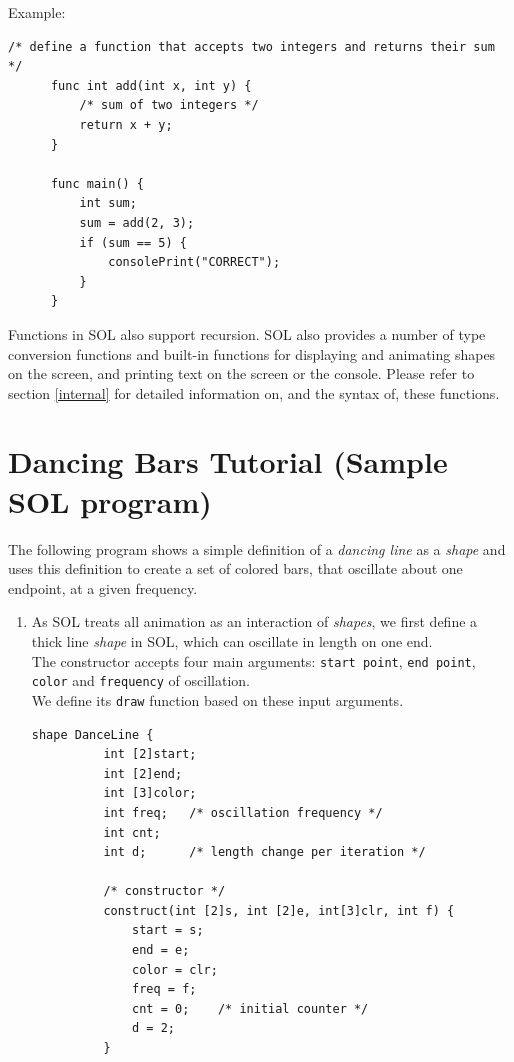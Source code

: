 \documentclass[letterpaper,12pt]{report}
\begin{document}
{    Example:\\
    \begin{lstlisting}[style=sol]
      /* define a function that accepts two integers and returns their sum */
      func int add(int x, int y) {
          /* sum of two integers */
          return x + y;
      }

      func main() {
          int sum;
          sum = add(2, 3);
          if (sum == 5) {
              consolePrint("CORRECT");
          }
      }
    \end{lstlisting}

    Functions in SOL also support recursion. SOL also provides a number of type conversion functions and built-in functions for displaying and animating shapes on the screen, and printing text on the screen or the console. Please refer to section \ref{internal} for detailed information on, and the syntax of, these functions.

  \section{Dancing Bars Tutorial (Sample SOL program)}
  The following program shows a simple definition of a \textit{dancing line} as a \textit{shape} and uses this definition to create a set of colored bars, that oscillate about one endpoint, at a given frequency.
  \begin{enumerate}
    \itemsep 0em
    \item As SOL treats all animation as an interaction of \textit{shapes}, we first define a thick line \textit{shape} in SOL, which can oscillate in length on one end.\\
    The constructor accepts four main arguments: \texttt{start point}, \texttt{end point}, \texttt{color} and \texttt{frequency} of oscillation.\\
    We define its \texttt{draw} function based on these input arguments.\\

    \begin{lstlisting}[style=sol, aboveskip=1pt]
      shape DanceLine {
          int [2]start;
          int [2]end;
          int [3]color;
          int freq;   /* oscillation frequency */
          int cnt;
          int d;      /* length change per iteration */

          /* constructor */
          construct(int [2]s, int [2]e, int[3]clr, int f) {
              start = s;
              end = e;
              color = clr; 
              freq = f;   
              cnt = 0;    /* initial counter */
              d = 2;  
          }


\end{lstlisting}
\end{enumerate}}
\end{document}
